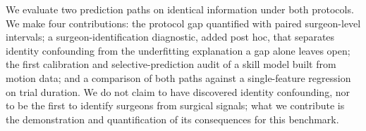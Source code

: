 We evaluate two prediction paths on identical information under both protocols. We make four contributions: the protocol gap quantified with paired surgeon-level intervals; a surgeon-identification diagnostic, added post hoc, that separates identity confounding from the underfitting explanation a gap alone leaves open; the first calibration and selective-prediction audit of a skill model built from motion data; and a comparison of both paths against a single-feature regression on trial duration. We do not claim to have discovered identity confounding, nor to be the first to identify surgeons from surgical signals; what we contribute is the demonstration and quantification of its consequences for this benchmark.
